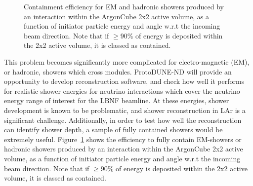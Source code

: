 \begin{figure}[htb]
  \centering
  \caption{Containment efficiency for EM and hadronic showers produced by an interaction within the ArgonCube 2x2 active volume, as a function of initiator particle energy and angle w.r.t the incoming beam direction. Note that if $\geq 90$\% of energy is deposited within the 2x2 active volume, it is classed as contained.}
  \label{fig:2x2_shower_containment}
\end{figure}
This problem becomes significantly more complicated for electro-magnetic (EM), or hadronic, showers which cross modules. ProtoDUNE-ND will provide an opportunity to develop reconstruction software, and check how well it performs for realistic shower energies for neutrino interactions which cover the neutrino energy range of interest for the LBNF beamline. At these energies, shower development is known to be problematic, and shower reconstruction in LAr is a significant challenge. Additionally, in order to test how well the reconstruction can identify shower depth, a sample of fully contained showers would be extremely useful. Figure~\ref{fig:2x2_shower_containment} shows the efficiency to fully contain EM-showers or hadronic showers produced by an interaction within the ArgonCube 2x2 active volume, as a function of initiator particle energy and angle w.r.t the incoming beam direction. Note that if $\geq 90$\% of energy is deposited within the 2x2 active volume, it is classed as contained. 

